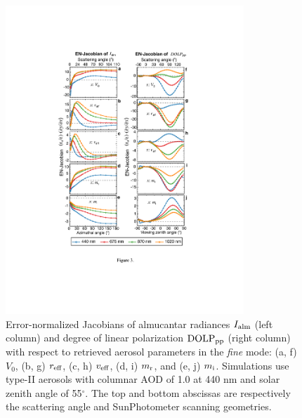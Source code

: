 \begin{figure}[p]
  \centering
  \includegraphics[width={0.8\textwidth}]{figures/info03.pdf}
  \caption[Error-normalized Jacobians of almucantar radiances 
and degree of linear polarization with respect 
to retrieved aerosol parameters in the \textit{fine} mode.]
{Error-normalized Jacobians of almucantar radiances $I_\text{alm}$ (left
column) and degree of linear polarization $\text{DOLP}_\text{pp}$ (right column) with respect
to retrieved aerosol parameters in the \textit{fine} mode: (a, f) $V_0$, (b, g)
$r_\text{eff}$, (c, h) $v_\text{eff}$, (d, i) $m_\text{r}$, and (e, j) $m_\text{i}$. Simulations use
type-II aerosols with columnar AOD of 1.0 at 440 nm and solar zenith angle of 
55$^\circ$. The top and bottom abscissas are respectively the scattering angle
and SunPhotometer scanning geometries.}
  \label{fig:infoenjf}
\end{figure}

